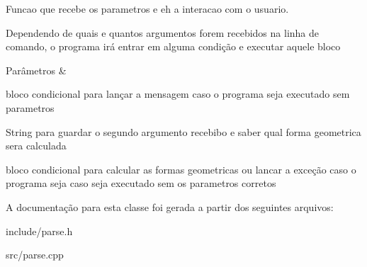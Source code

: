 Funcao que recebe os parametros e eh a interacao com o usuario. 

Dependendo de quais e quantos argumentos forem recebidos na linha de comando, o programa irá entrar em alguma condição e executar aquele bloco 
\begin{DoxyParams}{Parâmetros}
{\em } & \\
\hline
\end{DoxyParams}
bloco condicional para lançar a mensagem caso o programa seja executado sem parametros

String para guardar o segundo argumento recebibo e saber qual forma geometrica sera calculada

bloco condicional para calcular as formas geometricas ou lancar a exceção caso o programa seja caso seja executado sem os parametros corretos 

A documentação para esta classe foi gerada a partir dos seguintes arquivos\+:\begin{DoxyCompactItemize}
\item 
include/parse.\+h\item 
src/parse.\+cpp\end{DoxyCompactItemize}
